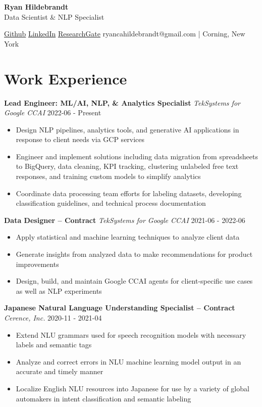 \documentclass[a4paper,9pt]{extarticle}
\begin{document}
\begin{center}
\textbf{\Large Ryan Hildebrandt}\\[2pt]
Data Scientist \& NLP Specialist

\href{https://github.com/ryancahildebrandt}{Github} \href{https://linkedin.com/in/rcah}{LinkedIn} \href{https://researchgate.net/profile/Ryan-Hildebrandt}{ResearchGate}
ryancahildebrandt@gmail.com | Corning, New York
	\end{center}

\section*{Work Experience}

\noindent
\textbf{Lead Engineer: ML/AI, NLP, \& Analytics Specialist}
\noindent
\textit{TekSystems for Google CCAI} \hfill 2022-06 - Present
\begin{itemize}
\item Design NLP pipelines, analytics tools, and generative AI applications in response to client needs via GCP services
\item Engineer and implement solutions including data migration from spreadsheets to BigQuery, data cleaning, KPI tracking, clustering unlabeled free text responses, and training custom models to simplify analytics
\item Coordinate data processing team efforts for labeling datasets, developing classification guidelines, and technical process documentation
\end{itemize}

\noindent
\textbf{Data Designer -- Contract}
\noindent
\textit{TekSystems for Google CCAI} \hfill 2021-06 - 2022-06
\begin{itemize}
\item Apply statistical and machine learning techniques to analyze client data
\item Generate insights from analyzed data to make recommendations for product improvements
\item Design, build, and maintain Google CCAI agents for client-specific use cases as well as NLP experiments
\end{itemize}

\noindent
\textbf{Japanese Natural Language Understanding Specialist -- Contract}
\noindent
\textit{Cerence, Inc.} \hfill 2020-11 - 2021-04
\begin{itemize}
\item Extend NLU grammars used for speech recognition models with necessary labels and semantic tags
\item Analyze and correct errors in NLU machine learning model output in an accurate and timely manner
\item Localize English NLU resources into Japanese for use by a variety of global automakers in intent classification and semantic labeling
\end{itemize}
\end{document}
